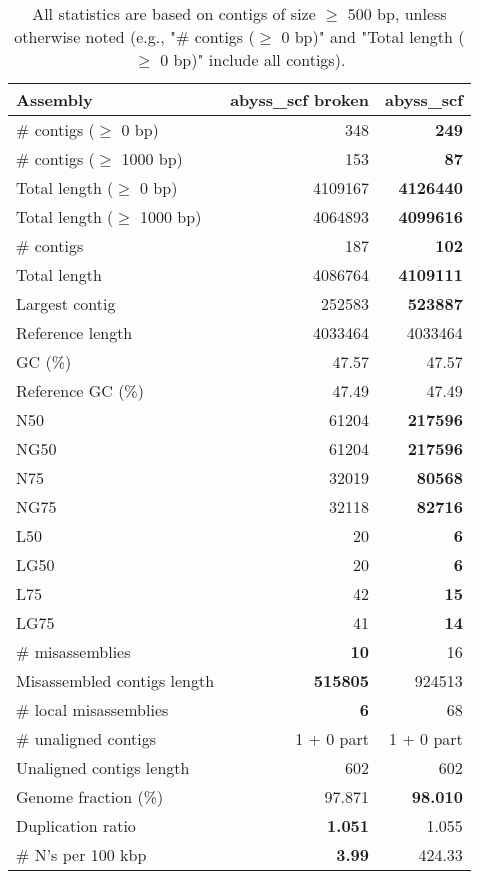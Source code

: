 \documentclass[12pt,a4paper]{article}
\begin{document}
\begin{table}[ht]
\begin{center}
\caption{All statistics are based on contigs of size $\geq$ 500 bp, unless otherwise noted (e.g., "\# contigs ($\geq$ 0 bp)" and "Total length ($\geq$ 0 bp)" include all contigs).}
\begin{tabular}{|l*{2}{|r}|}
\hline
Assembly & abyss\_scf broken & abyss\_scf \\ \hline
\# contigs ($\geq$ 0 bp) & 348 & {\bf 249} \\ \hline
\# contigs ($\geq$ 1000 bp) & 153 & {\bf 87} \\ \hline
Total length ($\geq$ 0 bp) & 4109167 & {\bf 4126440} \\ \hline
Total length ($\geq$ 1000 bp) & 4064893 & {\bf 4099616} \\ \hline
\# contigs & 187 & {\bf 102} \\ \hline
Total length & 4086764 & {\bf 4109111} \\ \hline
Largest contig & 252583 & {\bf 523887} \\ \hline
Reference length & 4033464 & 4033464 \\ \hline
GC (\%) & 47.57 & 47.57 \\ \hline
Reference GC (\%) & 47.49 & 47.49 \\ \hline
N50 & 61204 & {\bf 217596} \\ \hline
NG50 & 61204 & {\bf 217596} \\ \hline
N75 & 32019 & {\bf 80568} \\ \hline
NG75 & 32118 & {\bf 82716} \\ \hline
L50 & 20 & {\bf 6} \\ \hline
LG50 & 20 & {\bf 6} \\ \hline
L75 & 42 & {\bf 15} \\ \hline
LG75 & 41 & {\bf 14} \\ \hline
\# misassemblies & {\bf 10} & 16 \\ \hline
Misassembled contigs length & {\bf 515805} & 924513 \\ \hline
\# local misassemblies & {\bf 6} & 68 \\ \hline
\# unaligned contigs & 1 + 0 part & 1 + 0 part \\ \hline
Unaligned contigs length & 602 & 602 \\ \hline
Genome fraction (\%) & 97.871 & {\bf 98.010} \\ \hline
Duplication ratio & {\bf 1.051} & 1.055 \\ \hline
\# N's per 100 kbp & {\bf 3.99} & 424.33 \\ \hline

\end{tabular}
\end{center}
\end{table}
\end{document}
